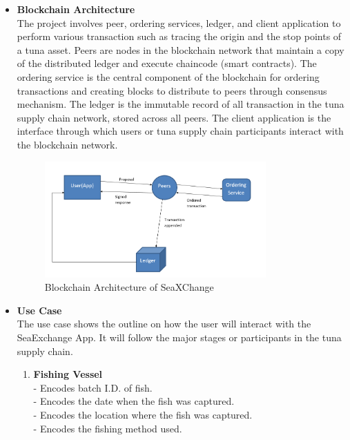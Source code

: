 	\begin{itemize}
		\item \textbf{Blockchain Architecture}
		\\The project involves peer, ordering services, ledger, and client application to perform various transaction such as tracing the origin and the stop points of a tuna asset. Peers are nodes in the blockchain network that maintain a copy of the distributed ledger and execute chaincode (smart contracts). The ordering service is the central component of the blockchain for ordering transactions and creating blocks to distribute to peers through consensus mechanism. The ledger is the immutable record of all transaction in the tuna supply chain network, stored across all peers. The client application is the interface through which users or tuna supply chain participants interact with the blockchain network.
		
		\begin{figure}[H]
			\centering
			\includegraphics[width=0.8\textwidth]{SeaXChange_model.png}
			\caption{Blockchain Architecture of SeaXChange}
			\label{fig:blockchain_model}
		\end{figure}
		
		
		
		\item \textbf{Use Case}
		\\The use case shows the outline on how the user will interact with the SeaExchange App. It will follow the major stages or participants in the tuna supply chain. 
		\begin{enumerate}
			\item \textbf{Fishing Vessel}
			\\- Encodes batch I.D. of fish.
			\\- Encodes the date when the fish was captured.
			\\- Encodes the location where the fish was captured.
			\\- Encodes the fishing method used.
			

\end{enumerate}
\end{itemize}
